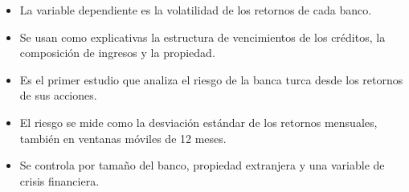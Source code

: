 \documentclass{article}
\newcommand{\cardtitlesize}{\fontsize{36.6}{43.9}\selectfont}
\newcommand{\cardtitle}[2][navy]{{\color{#1}\cardtitlesize\bfseries\textls[110]{\MakeUppercase{#2}}}\par\vspace{7mm}}
\begin{document}
\vfill
\hspace*{34mm}\begin{minipage}{773mm}
\begin{tcolorbox}[card]\cardtitle{Metodología}
\begin{minipage}[t]{0.48\linewidth}
\begin{itemize}
\item La variable dependiente es la volatilidad de los retornos de cada banco.
\item Se usan como explicativas la estructura de vencimientos de los créditos, la composición de ingresos y la propiedad.
\item Es el primer estudio que analiza el riesgo de la banca turca desde los retornos de sus acciones.
\end{itemize}
\end{minipage}\hfill
\begin{minipage}[t]{0.48\linewidth}
\begin{itemize}
\item El riesgo se mide como la desviación estándar de los retornos mensuales, también en ventanas móviles de 12 meses.
\item Se controla por tamaño del banco, propiedad extranjera y una variable de crisis financiera.
\end{itemize}
\end{minipage}
\end{tcolorbox}
\end{minipage}
\end{document}
